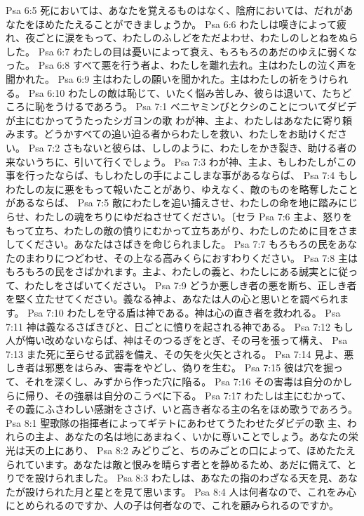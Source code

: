 Psa 6:5  死においては、あなたを覚えるものはなく、陰府においては、だれがあなたをほめたたえることができましょうか。
Psa 6:6  わたしは嘆きによって疲れ、夜ごとに涙をもって、わたしのふしどをただよわせ、わたしのしとねをぬらした。
Psa 6:7  わたしの目は憂いによって衰え、もろもろのあだのゆえに弱くなった。
Psa 6:8  すべて悪を行う者よ、わたしを離れ去れ。主はわたしの泣く声を聞かれた。
Psa 6:9  主はわたしの願いを聞かれた。主はわたしの祈をうけられる。
Psa 6:10  わたしの敵は恥じて、いたく悩み苦しみ、彼らは退いて、たちどころに恥をうけるであろう。
Psa 7:1  ベニヤミンびとクシのことについてダビデが主にむかってうたったシガヨンの歌 わが神、主よ、わたしはあなたに寄り頼みます。どうかすべての追い迫る者からわたしを救い、わたしをお助けください。
Psa 7:2  さもないと彼らは、ししのように、わたしをかき裂き、助ける者の来ないうちに、引いて行くでしょう。
Psa 7:3  わが神、主よ、もしわたしがこの事を行ったならば、もしわたしの手によこしまな事があるならば、
Psa 7:4  もしわたしの友に悪をもって報いたことがあり、ゆえなく、敵のものを略奪したことがあるならば、
Psa 7:5  敵にわたしを追い捕えさせ、わたしの命を地に踏みにじらせ、わたしの魂をちりにゆだねさせてください。〔セラ
Psa 7:6  主よ、怒りをもって立ち、わたしの敵の憤りにむかって立ちあがり、わたしのために目をさましてください。あなたはさばきを命じられました。
Psa 7:7  もろもろの民をあなたのまわりにつどわせ、その上なる高みくらにおすわりください。
Psa 7:8  主はもろもろの民をさばかれます。主よ、わたしの義と、わたしにある誠実とに従って、わたしをさばいてください。
Psa 7:9  どうか悪しき者の悪を断ち、正しき者を堅く立たせてください。義なる神よ、あなたは人の心と思いとを調べられます。
Psa 7:10  わたしを守る盾は神である。神は心の直き者を救われる。
Psa 7:11  神は義なるさばきびと、日ごとに憤りを起される神である。
Psa 7:12  もし人が悔い改めないならば、神はそのつるぎをとぎ、その弓を張って構え、
Psa 7:13  また死に至らせる武器を備え、その矢を火矢とされる。
Psa 7:14  見よ、悪しき者は邪悪をはらみ、害毒をやどし、偽りを生む。
Psa 7:15  彼は穴を掘って、それを深くし、みずから作った穴に陥る。
Psa 7:16  その害毒は自分のかしらに帰り、その強暴は自分のこうべに下る。
Psa 7:17  わたしは主にむかって、その義にふさわしい感謝をささげ、いと高き者なる主の名をほめ歌うであろう。
Psa 8:1  聖歌隊の指揮者によってギテトにあわせてうたわせたダビデの歌 主、われらの主よ、あなたの名は地にあまねく、いかに尊いことでしょう。あなたの栄光は天の上にあり、
Psa 8:2  みどりごと、ちのみごとの口によって、ほめたたえられています。あなたは敵と恨みを晴らす者とを静めるため、あだに備えて、とりでを設けられました。
Psa 8:3  わたしは、あなたの指のわざなる天を見、あなたが設けられた月と星とを見て思います。
Psa 8:4  人は何者なので、これをみ心にとめられるのですか、人の子は何者なので、これを顧みられるのですか。

